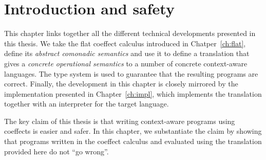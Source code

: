 \section{Introduction and safety}
\label{sec:semantics-intro}

This chapter links together all the different technical developments presented in this thesis.
We take the flat coeffect calculus introduced in Chatper~\ref{ch:flat}, define its \emph{abstract 
comonadic semantics} and use it to define a translation that gives a \emph{concrete operational
semantics} to a number of concrete context-aware languages. The type system is used to guarantee 
that the resulting programs are correct. Finally, the development in this chapter is closely 
mirrored by the implementation presented in Chapter~\ref{ch:impl}, which implements the 
translation together with an interpreter for the target language.

The key claim of this thesis is that writing context-aware programs using coeffects is easier and
safer. In this chapter, we substantiate the claim by showing that programs written in the coeffect
calculus and evaluated using the translation provided here do not ``go wrong''. 

